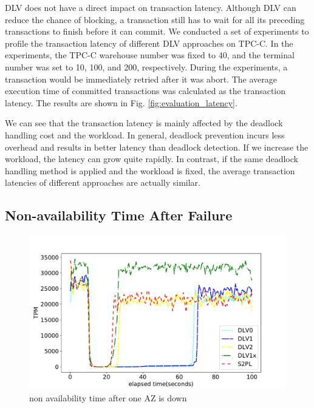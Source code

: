\documentclass[conference]{IEEEtran}
\begin{document}
  DLV does not have a direct impact on transaction latency.
  Although DLV can reduce the chance of blocking, a transaction still has to wait for all its preceding transactions to finish before it can commit.
  We conducted a set of experiments to profile the transaction latency of different DLV approaches on TPC-C. 
  In the experiments, the TPC-C warehouse number was fixed to 40, and the terminal number was set to 10, 100, and 200, respectively.
  During the experiments, a transaction would be immediately retried after it was abort.
  The average execution time of committed transactions was calculated as the transaction latency. The results are shown in Fig. \ref{fig:evaluation_latency}.
  
  We can see that the transaction latency is mainly affected by the deadlock handling cost and the workload.
  In general, deadlock prevention incurs less overhead and results in better latency than deadlock detection. If we increase the workload, the latency can grow quite rapidly.
  In contrast, if the same deadlock handling method is applied and the workload is fixed, the average transaction latencies of different approaches are actually similar. 

\iffalse
\subsection{Non-availability Time After Failure}


\begin{figure}[tbp]
  \centering
  { \includegraphics[scale=0.28] {figure/plot_availability}
  \caption{non availability time after one AZ is down}
  \label{fig:plot_availability:tpm}}
\end{figure}
\end{document}
